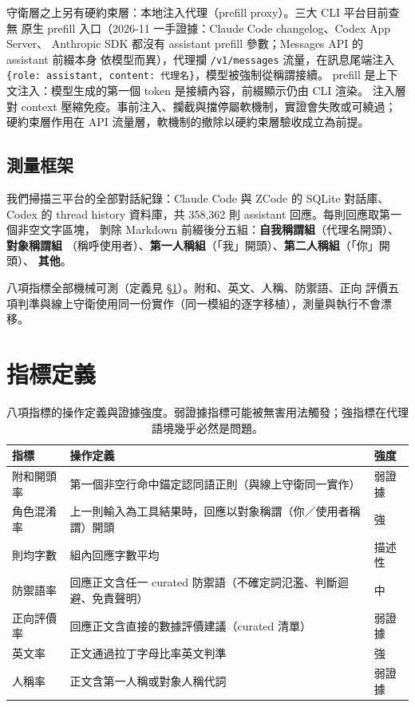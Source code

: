 \documentclass[10pt,twocolumn]{article}
\begin{document}
守衛層之上另有硬約束層：本地注入代理（prefill proxy）。三大 CLI 平台目前查無
原生 prefill 入口（2026-11 一手證據：Claude Code changelog、Codex App Server、
Anthropic SDK 都沒有 assistant prefill 參數；Messages API 的 assistant 前綴本身
依模型而異），代理攔 \texttt{/v1/messages} 流量，在訊息尾端注入
\texttt{\{role: assistant, content: 代理名\}}，模型被強制從稱謂接續。
prefill 是上下文注入：模型生成的第一個 token 是接續內容，前綴顯示仍由 CLI 渲染。
注入層對 context 壓縮免疫。事前注入、攔截與擋停屬軟機制，實證會失敗或可繞過；
硬約束層作用在 API 流量層，軟機制的撤除以硬約束層驗收成立為前提。

\subsection{測量框架}
我們掃描三平台的全部對話紀錄：Claude Code 與 ZCode 的 SQLite 對話庫、Codex 的
thread history 資料庫，共 358{,}362 則 assistant 回應。每則回應取第一個非空文字區塊，
剝除 Markdown 前綴後分五組：\textbf{自我稱謂組}（代理名開頭）、\textbf{對象稱謂組}
（稱呼使用者）、\textbf{第一人稱組}（「我」開頭）、\textbf{第二人稱組}（「你」開頭）、
\textbf{其他}。

八項指標全部機械可測（定義見 \S\ref{sec:metrics}）。附和、英文、人稱、防禦語、正向
評價五項判準與線上守衛使用同一份實作（同一模組的逐字移植），測量與執行不會漂移。

\section{指標定義}\label{sec:metrics}
\begin{table}[t]
\centering
\small
\begin{tabular}{p{2.6cm}p{4.2cm}p{1.6cm}}
\toprule
指標 & 操作定義 & 強度 \\
\midrule
附和開頭率 & 第一個非空行命中錨定認同語正則（與線上守衛同一實作） & 弱證據 \\
角色混淆率 & 上一則輸入為工具結果時，回應以對象稱謂（你／使用者稱謂）開頭 & 強 \\
則均字數 & 組內回應字數平均 & 描述性 \\
防禦語率 & 回應正文含任一 curated 防禦語（不確定詞氾濫、判斷迴避、免責聲明） & 中 \\
正向評價率 & 回應正文含直接的數據評價建議（curated 清單） & 弱證據 \\
英文率 & 正文通過拉丁字母比率英文判準 & 強 \\
人稱率 & 正文含第一人稱或對象人稱代詞 & 弱證據 \\
\bottomrule
\end{tabular}
\caption{八項指標的操作定義與證據強度。弱證據指標可能被無害用法觸發；強指標在代理
語境幾乎必然是問題。}
\label{tab:metrics}
\end{table}
\end{document}
